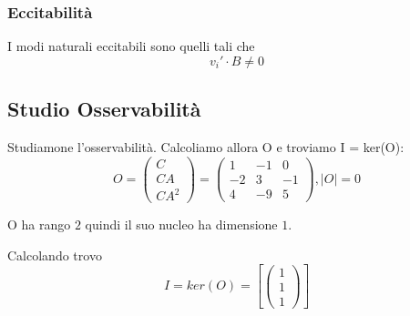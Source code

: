 \documentclass{article}
\begin{document}
\subsubsection{Eccitabilità}
 I modi naturali eccitabili sono quelli tali che 
\[v_i' \cdot B \neq 0\]

\subsection{Studio Osservabilità}

Studiamone l’osservabilità. Calcoliamo allora O e troviamo I = ker(O):
\[
 O = \begin{pmatrix}C \\ CA \\ CA^2 \end{pmatrix} = \left(\begin{matrix}1 & -1 & 0\\-2 & 3 & -1\\4 & -9 & 5\end{matrix}\right), |O| = 0 \]

O ha rango $ 2 $ quindi il suo nucleo ha dimensione $ 1 $.

Calcolando trovo \[ 
I = ker(O) = \left[ \left(\begin{matrix}1\\1\\1\end{matrix}\right)\right]\]
\end{document}
